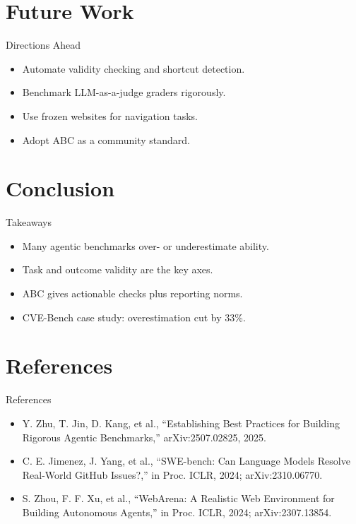 \documentclass{beamer}
\begin{document}
\section{Future Work}
\begin{frame}{Directions Ahead}
\begin{itemize}
\item Automate validity checking and shortcut detection.
\item Benchmark LLM-as-a-judge graders rigorously.
\item Use frozen websites for navigation tasks.
\item Adopt ABC as a community standard.
\end{itemize}
\end{frame}

\section{Conclusion}
\begin{frame}{Takeaways}
\begin{itemize}
\item Many agentic benchmarks over- or underestimate ability.
\item Task and outcome validity are the key axes.
\item ABC gives actionable checks plus reporting norms.
\item CVE-Bench case study: overestimation cut by 33\%.
\end{itemize}
\end{frame}

\section{References}
\begin{frame}{References}
\footnotesize
\begin{itemize}
\item Y. Zhu, T. Jin, D. Kang, et al., ``Establishing Best Practices for Building Rigorous Agentic Benchmarks,'' arXiv:2507.02825, 2025.
\item C. E. Jimenez, J. Yang, et al., ``SWE-bench: Can Language Models Resolve Real-World GitHub Issues?,'' in Proc. ICLR, 2024; arXiv:2310.06770.
\item S. Zhou, F. F. Xu, et al., ``WebArena: A Realistic Web Environment for Building Autonomous Agents,'' in Proc. ICLR, 2024; arXiv:2307.13854.
\end{itemize}
\end{frame}
\begin{frame}\vfill{}\vfill\end{frame}
\end{document}
